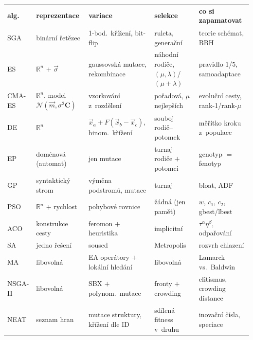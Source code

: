 \documentclass[10pt,a4paper]{article}
\begin{document}
\vspace{0.2em}
\begin{center}
\footnotesize
\begin{tabular}{@{}p{1.35cm}p{3.0cm}p{3.9cm}p{2.9cm}p{4.4cm}@{}}
\toprule
\textbf{alg.} & \textbf{reprezentace} & \textbf{variace} & \textbf{selekce} &
\textbf{co si zapamatovat} \\
\midrule
SGA & binární řetězec & 1-bod.\ křížení, bit-flip & ruleta, generační &
  teorie schémat, BBH \\
ES & $\mathbb{R}^n$ $+$ $\vec\sigma$ & gaussovská mutace, rekombinace &
  náhodní rodiče, $(\mu,\lambda)$/$(\mu{+}\lambda)$ & pravidlo 1/5, samoadaptace \\
CMA-ES & $\mathbb{R}^n$, model $\mathcal N(\vec m,\sigma^2\mathbf C)$ & vzorkování z~rozdělení &
  pořadová, $\mu$ nejlepších & evoluční cesty, rank-1/rank-$\mu$ \\
DE & $\mathbb{R}^n$ & $\vec x_a + F(\vec x_b-\vec x_c)$, binom.\ křížení &
  souboj rodič--potomek & měřítko kroku z~populace \\
EP & doménová (automat) & jen mutace & turnaj rodiče $+$ potomci & genotyp $=$ fenotyp \\
GP & syntaktický strom & výměna podstromů, mutace & turnaj & bloat, ADF \\
PSO & $\mathbb{R}^n$ $+$ rychlost & pohybové rovnice & žádná (jen paměť) &
  $w$, $c_1$, $c_2$, gbest/lbest \\
ACO & konstrukce cesty & feromon $+$ heuristika & implicitní &
  $\tau^\alpha\eta^\beta$, odpařování \\
SA & jedno řešení & soused & Metropolis & rozvrh chlazení \\
MA & libovolná & EA operátory $+$ lokální hledání & libovolná & Lamarck vs.\ Baldwin \\
NSGA-II & libovolná & SBX $+$ polynom.\ mutace & fronty $+$ crowding &
  elitismus, crowding distance \\
NEAT & seznam hran & mutace struktury, křížení dle ID & sdílená fitness v~druhu &
  inovační čísla, speciace \\
\bottomrule
\end{tabular}
\end{center}
\end{document}
